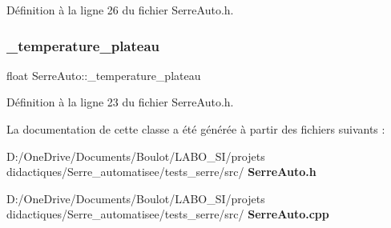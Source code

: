 Définition à la ligne 26 du fichier Serre\+Auto.\+h.

\mbox{\label{class_serre_auto_a4a5a4427ccb7dc37323b29a541f84759}} 
\subsubsection{\+\_\+temperature\+\_\+plateau}
{\footnotesize\ttfamily float Serre\+Auto\+::\+\_\+temperature\+\_\+plateau\hspace{0.3cm}{\ttfamily [private]}}



Définition à la ligne 23 du fichier Serre\+Auto.\+h.



La documentation de cette classe a été générée à partir des fichiers suivants \+:\begin{DoxyCompactItemize}
\item 
D\+:/\+One\+Drive/\+Documents/\+Boulot/\+L\+A\+B\+O\+\_\+\+S\+I/projets didactiques/\+Serre\+\_\+automatisee/tests\+\_\+serre/src/\textbf{ Serre\+Auto.\+h}\item 
D\+:/\+One\+Drive/\+Documents/\+Boulot/\+L\+A\+B\+O\+\_\+\+S\+I/projets didactiques/\+Serre\+\_\+automatisee/tests\+\_\+serre/src/\textbf{ Serre\+Auto.\+cpp}\end{DoxyCompactItemize}
